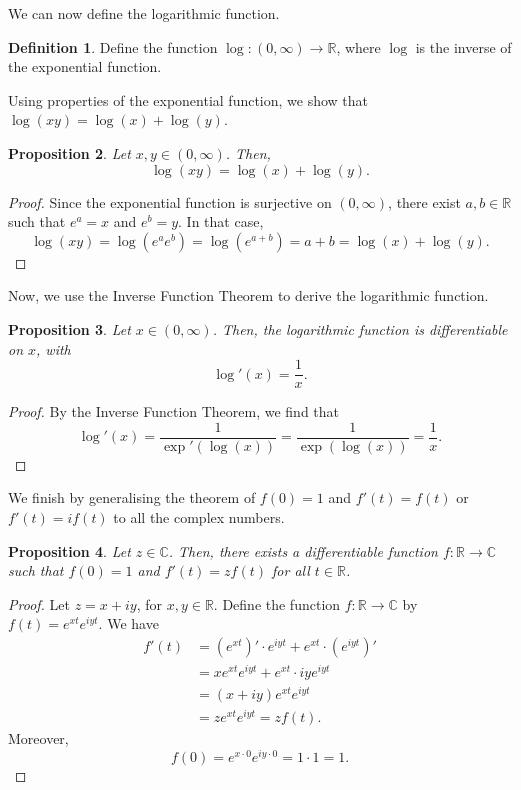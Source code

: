 \documentclass[a4paper, openany]{memoir}
\theoremstyle{definition}
\newtheorem{definition}{Definition}[section]
\theoremstyle{plain}
\newtheorem{proposition}[definition]{Proposition}
\begin{document}
We can now define the logarithmic function.
\begin{definition}
Define the function $\log: (0, \infty) \to \mathbb{R}$, where $\log$ is the inverse of the exponential function.
\end{definition}
\noindent Using properties of the exponential function, we show that $\log (xy) = \log (x) + \log (y)$.
\begin{proposition}
Let $x, y \in (0, \infty)$. Then,
\[\log (xy) = \log (x) + \log (y).\]
\end{proposition}
\begin{proof}
Since the exponential function is surjective on $(0, \infty)$, there exist $a, b \in \mathbb{R}$ such that $e^a = x$ and $e^b = y$. In that case,
\[\log (xy) = \log (e^a e^b) = \log (e^{a + b}) = a + b = \log (x) + \log (y).\]
\end{proof}
\noindent Now, we use the Inverse Function Theorem to derive the logarithmic function.
\begin{proposition}
Let $x \in (0, \infty)$. Then, the logarithmic function is differentiable on $x$, with
\[\log'(x) = \frac{1}{x}.\]
\end{proposition}
\begin{proof}
By the Inverse Function Theorem, we find that
\[\log'(x) = \frac{1}{\exp'(\log (x))} = \frac{1}{\exp (\log (x))} = \frac{1}{x}.\]
\end{proof}
\noindent We finish by generalising the theorem of $f(0) = 1$ and $f'(t) = f(t)$ or $f'(t) = if(t)$ to all the complex numbers.
\begin{proposition}
Let $z \in \mathbb{C}$. Then, there exists a differentiable function $f: \mathbb{R} \to \mathbb{C}$ such that $f(0) = 1$ and $f'(t) = z f(t)$ for all $t \in \mathbb{R}$.
\end{proposition}
\begin{proof}
Let $z = x + iy$, for $x, y \in \mathbb{R}$. Define the function $f: \mathbb{R} \to \mathbb{C}$ by $f(t) = e^{xt} e^{iyt}$. We have
\begin{align*}
    f'(t) &= (e^{xt})' \cdot e^{iyt} + e^{xt} \cdot (e^{iyt})' \\
    &= xe^{xt} e^{iyt} + e^{xt} \cdot iy e^{iyt} \\
    &= (x + iy) e^{xt} e^{iyt} \\
    &= ze^{xt} e^{iyt} = zf(t).
\end{align*}
Moreover,
\[f(0) = e^{x \cdot 0} e^{iy \cdot 0} = 1 \cdot 1 = 1.\]
\end{proof}
\end{document}

